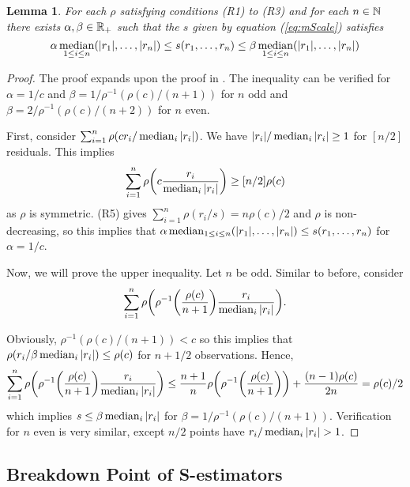 \newtheorem{lemma}{Lemma}
\begin{lemma}
\label{lem:mScaleBound}
For each $\rho$ satisfying conditions (R1) to (R3) and for each $n \in \mathbb{N}$ there exists $\alpha,\beta \in \mathbb{R}_+$ such that the $s$ given by equation (\ref{eq:mScale}) satisfies
\begin{equation}
\label{eq:sIneq}
    \alpha \operatorname*{median}_{1\leq i \leq n}(|r_1|,\hdots, |r_n|) \leq s(r_1,\hdots, r_n) \leq \beta \operatorname*{median}_{1\leq i \leq n}(|r_1|,\hdots, |r_n|)
\end{equation}
\end{lemma}
\begin{proof}[Proof]
The proof expands upon the proof in \cite{rousseeuw1984least}. The inequality can be verified for $\alpha = 1/c$ and $\beta = 1/\rho^{-1}(\rho(c)/(n+1))$ for $n$ odd and $\beta = 2/\rho^{-1}(\rho(c)/(n+2))$ for $n$ even. 

First, consider $\sum_{i=1}^n \rho(c r_i/ \operatorname*{median}_i |r_i|) $. We have $|r_i|/ \operatorname*{median}_i |r_i| \geq 1$ for $[n/2]$ residuals. This implies 
$$\sum_{i=1}^n \rho\bigg(c\frac{r_i}{\operatorname*{median}_i |r_i|}\bigg) \geq [n/2] \rho(c)$$ 
as $\rho$ is symmetric. (R5) gives $\sum_{i=1}^n \rho(r_i/s) = n\rho(c)/2$ and $\rho$ is non-decreasing, so this implies that $\alpha \operatorname*{median}_{1\leq i \leq n}(|r_1|,\hdots, |r_n|) \leq s(r_1,\hdots, r_n)$ for $\alpha = 1/c$. 

Now, we will prove the upper inequality. Let $n$ be odd. Similar to before, consider 
$$\sum_{i=1}^n \rho\bigg(\rho^{-1}\bigg(\frac{\rho(c)}{n+1}\bigg) \frac{r_i}{\operatorname*{median}_i |r_i|}\bigg).$$

Obviously, $\rho^{-1}(\rho(c)/(n+1)) < c$ so this implies that $\rho(r_i/ \beta \operatorname*{median}_i |r_i|) \leq \rho(c)$ for $n+1/2$ observations. Hence, 
$$\sum_{i=1}^n \rho\bigg(\rho^{-1}\bigg(\frac{\rho(c)}{n+1}\bigg) \frac{r_i}{\operatorname*{median}_i |r_i|}\bigg) \leq \frac{n+1}{n} \rho\bigg(\rho^{-1}\bigg(\frac{\rho(c)}{n+1}\bigg)\bigg) + \frac{(n-1)\rho(c)}{2n} = \rho(c)/2$$ 
which implies $s \leq \beta \operatorname*{median}_i |r_i|$ for $\beta = 1/\rho^{-1}(\rho(c)/(n+1))$. Verification for $n$ even is very similar, except $n/2$ points have $r_i/ \operatorname*{median}_i |r_i| > 1$. 

\end{proof}

\subsection{Breakdown Point of S-estimators}

